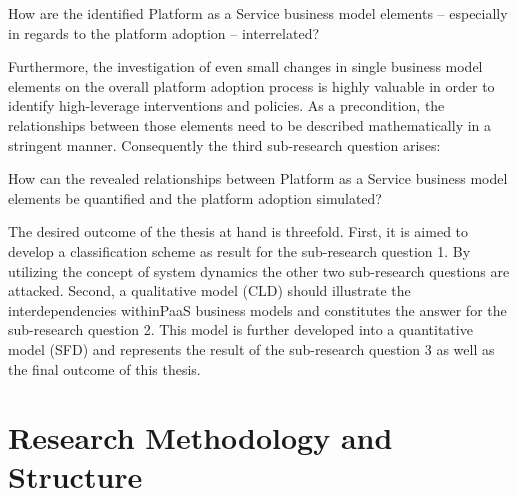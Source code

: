 \begin{SRQ}\label{srq2}
How are the identified Platform as a Service business model elements -- especially in regards to the platform adoption -- interrelated?
\end{SRQ}

Furthermore, the investigation of even small changes in single business model elements on the overall platform adoption process is highly valuable in order to identify high-leverage interventions and policies. As a precondition, the relationships between those elements need to be described mathematically in a stringent manner. Consequently the third sub-research question arises:

\begin{SRQ}\label{srq3}
How can the revealed relationships between Platform as a Service business model elements be quantified and the platform adoption simulated?
\end{SRQ}

The desired outcome of the thesis at hand is threefold. First, it is aimed to develop a classification scheme as result for the sub-research question 1. By utilizing the concept of system dynamics the other two sub-research questions are attacked. Second, a qualitative model (\ac{CLD}) should illustrate the interdependencies within\ac{PaaS} business models and constitutes the answer for the sub-research question 2. This model is further developed into a quantitative model (\ac{SFD}) and represents the result of the sub-research question 3 as well as the final outcome of this thesis.
	
\section{Research Methodology and Structure}\label{ch:intro:met}

